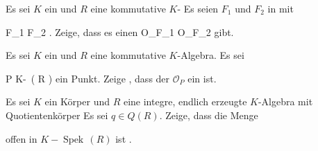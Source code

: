 {}
{





Es sei $K$ ein
und $R$ eine
kommutative
$K$-
Es seien $F_1$ und $F_2$
in
 mit

\mavergleichskette
{\vergleichskette
{ F_1
}
{ \subseteq }{ F_2
}
{  }{
}
{    }{
}
{   }{
}
}
{}{}{.}
Zeige, dass es einen
\maabbdisp {} { {\mathcal O}_{F_1 } } { {\mathcal O}_{F_2 }
} {}
gibt.





}
{} {}

{}
{





Es sei $K$ ein
und $R$ eine
kommutative $K$-Algebra. Es sei

\mavergleichskette
{\vergleichskette
{ P
}
{ \in }{ K\!-\!\, \left(  R  \right)
}
{  }{
}
{    }{
}
{   }{
}
}
{}{}{}
ein Punkt. Zeige
 {} {}, dass der
${\mathcal O}_{ P }$ ein
ist.





}
{} {}

{}
{





Es sei $K$ ein Körper und $R$ eine integre, endlich erzeugte $K$-Algebra mit Quotientenkörper
 Es sei $q \in Q(R)$. Zeige, dass die Menge

 {  }

offen in $K\!-\!\operatorname{Spek}\, \left(  R  \right)$ ist
 {} {.}





}
{} {}


